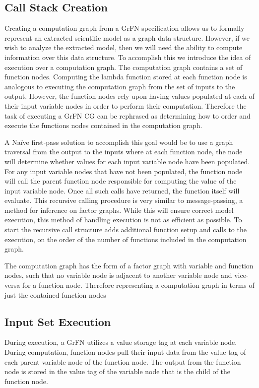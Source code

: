 \subsection{Call Stack Creation\label{sec:call_stack}}
Creating a computation graph from a GrFN specification allows us to formally represent an extracted scientific model as a graph data structure. However, if we wish to analyze the extracted model, then we will need the ability to compute information over this data structure. To accomplish this we introduce the idea of execution over a computation graph. The computation graph contains a set of function nodes. Computing the lambda function stored at each function node is analogous to executing the computation graph from the set of inputs to the output. However, the function nodes rely upon having values populated at each of their input variable nodes in order to perform their computation. Therefore the task of executing a GrFN CG can be rephrased as determining how to order and execute the functions nodes contained in the computation graph.

A Naïve first-pass solution to accomplish this goal would be to use a graph traversal from the output to the inputs where at each function node, the node will determine whether values for each input variable node have been populated. For any input variable nodes that have not been populated, the function node will call the parent function node responsible for computing the value of the input variable node. Once all such calls have returned, the function itself will evaluate. This recursive calling procedure is very similar to message-passing, a method for inference on factor graphs. While this will ensure correct model execution, this method of handling execution is not as efficient as possible. To start the recursive call structure adds additional function setup and calls to the execution, on the order of the number of functions included in the computation graph.

The computation graph has the form of a factor graph with variable and function nodes, such that no variable node is adjacent to another variable node and vice-versa for a function node. Therefore representing a computation graph in terms of just the contained function nodes

\subsection{Input Set Execution\label{sec:input_execution}}
During execution, a GrFN utilizes a value storage tag at each variable node. During computation, function nodes pull their input data from the value tag of each parent variable node of the function node. The output from the function node is stored in the value tag of the variable node that is the child of the function node.

